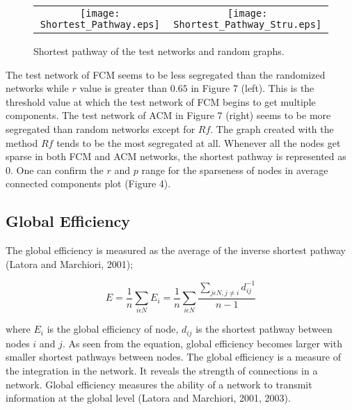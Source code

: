 \documentclass[12pt]{article}
\begin{document}
\begin{figure}[htp]

  \centering

    \begin{tabular}{cc}


    \texttt{[image: Shortest\_Pathway.eps]} &

    \texttt{[image: Shortest\_Pathway\_Stru.eps]}\\

  \end{tabular}

 \label{figur}\caption{Shortest pathway of the test networks and random graphs. }

\end{figure}

The test network of FCM seems to be less segregated than the randomized networks while $r$ value is greater than $0.65$ in Figure 7 (left). This is the threshold value at which the test network of FCM begins to get multiple components. The test network of ACM in Figure 7 (right) seems to be more segregated than random networks except for $Rf$. The graph created with the method $Rf$ tends to be the most segregated at all. Whenever all the nodes get sparse in both FCM and ACM networks, the shortest pathway is represented as 0. One can confirm the $r$ and $p$ range for the sparseness of nodes in average connected components plot (Figure 4).

\subsection{Global Efficiency}
The global efficiency is measured as the average of the inverse shortest pathway (Latora and Marchiori, 2001);

\begin{equation}
E = \frac{1}{n}\sum\limits_{i \epsilon N} E_i = \frac{1}{n}\sum\limits_{i \epsilon N} \frac{\sum\limits_{j \epsilon N, j\neq i}d_{ij}^{-1}}{n-1 }
\end{equation}

where $E_i$ is the global efficiency of node, $d_{ij}$ is the shortest pathway between nodes $i$ and $j$. As seen from the equation, global efficiency becomes larger with smaller shortest pathways between nodes. The global efficiency is a measure of the integration in the network. It reveals the strength of connections in a network. Global efficiency measures the ability of a network to transmit information at the global level (Latora and Marchiori, 2001, 2003).
\end{document}
